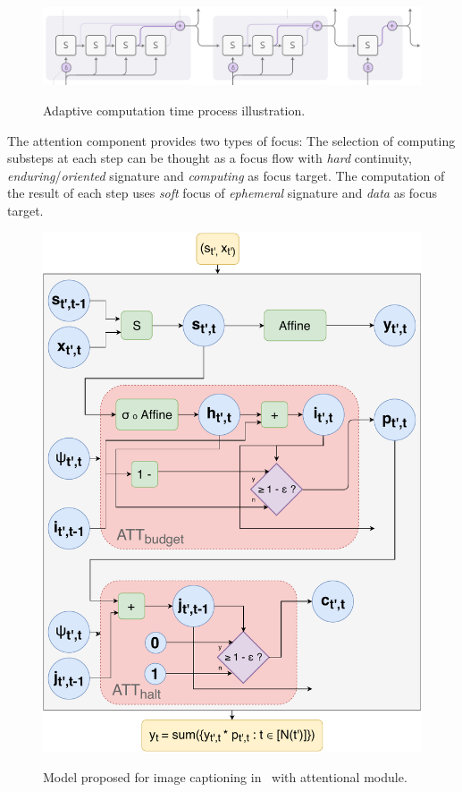 \documentclass[11pt]{article}
\begin{document}
\begin{figure}[H]
    \centering
    \includegraphics[width=0.8\linewidth]{./img/adaptive_comp.png}\label{fig:act}
    \caption{Adaptive computation time process illustration.}
\end{figure}

The attention component provides two types of focus:
The selection of computing substeps at each step can be thought as a focus flow with \emph{hard} continuity, \emph{enduring}/\emph{oriented} signature and \emph{computing} as focus target.
The computation of the result of each step uses \emph{soft} focus of \emph{ephemeral} signature and \emph{data} as focus target.

\begin{figure}[H]
    \centering
    \includegraphics[width=0.65\linewidth]{./img/act.pdf}\label{fig:act}
    \caption{Model proposed for image captioning in~\cite{ref:act} with attentional module.}
\end{figure}
\end{document}
